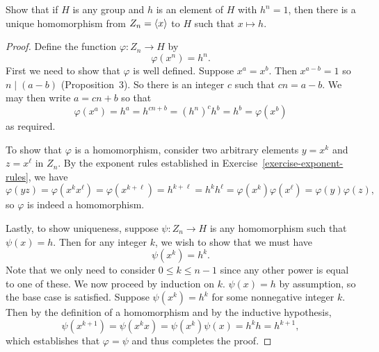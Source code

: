  Show that if $H$ is any group and $h$ is an element of
$H$ with $h^n = 1$, then there is a unique homomorphism from
$Z_n = \langle{x}\rangle$ to $H$ such that $x\mapsto h$.
\begin{proof}
  Define the function $\varphi\colon Z_n\to H$ by
  \begin{equation*}
    \varphi(x^n) = h^n.
  \end{equation*}
  First we need to show that $\varphi$ is well defined. Suppose
  $x^a = x^b$. Then $x^{a-b} = 1$ so $n\mid(a-b)$ (Proposition~3). So
  there is an integer $c$ such that $cn = a - b$. We may then write
  $a = cn + b$ so that
  \begin{equation*}
    \varphi(x^a) = h^a = h^{cn+b} = (h^n)^ch^b = h^b = \varphi(x^b)
  \end{equation*}
  as required.

  To show that $\varphi$ is a homomorphism, consider two arbitrary
  elements $y = x^k$ and $z = x^\ell$ in $Z_n$. By the exponent rules
  established in Exercise~\ref{exercise-exponent-rules}, we have
  \begin{equation*}
    \varphi(yz) = \varphi(x^kx^\ell) = \varphi(x^{k+\ell})
    = h^{k+\ell} = h^kh^\ell = \varphi(x^k)\varphi(x^\ell)
    = \varphi(y)\varphi(z),
  \end{equation*}
  so $\varphi$ is indeed a homomorphism.

  Lastly, to show uniqueness, suppose $\psi\colon Z_n\to H$ is any
  homomorphism such that $\psi(x) = h$. Then for any integer $k$, we
  wish to show that we must have
  \begin{equation*}
    \psi(x^k) = h^k.
  \end{equation*}
  Note that we only need to consider $0\leq k\leq n-1$ since any other
  power is equal to one of these. We now proceed by induction on
  $k$. $\psi(x) = h$ by assumption, so the base case is
  satisfied. Suppose $\psi(x^k) = h^k$ for some nonnegative integer
  $k$. Then by the definition of a homomorphism and by the inductive
  hypothesis,
  \begin{equation*}
    \psi(x^{k+1}) = \psi(x^kx)
    = \psi(x^k)\psi(x) = h^kh = h^{k+1},
  \end{equation*}
  which establishes that $\varphi = \psi$ and thus completes the
  proof.
\end{proof}

